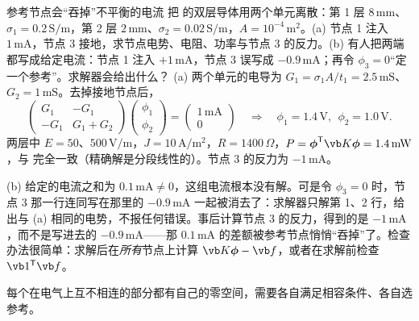 \begin{example}[label=ex:femscalar-twolayer]{参考节点会“吞掉”不平衡的电流}
把 的双层导体用两个单元离散：第 1 层 $8\,\mathrm{mm}$、$\sigma_1=0.2\,\mathrm{S/m}$，第 2 层 $2\,\mathrm{mm}$、$\sigma_2=0.02\,\mathrm{S/m}$，$A=10^{-4}\,\mathrm{m^2}$。(a) 节点 1 注入 $1\,\mathrm{mA}$，节点 3 接地，求节点电势、电阻、功率与节点 3 的反力。(b) 有人把两端都写成给定电流：节点 1 注入 $+1\,\mathrm{mA}$，节点 3 误写成 $-0.9\,\mathrm{mA}$；再令 $\phi_3=0$“定一个参考”。求解器会给出什么？
\solution
(a) 两个单元的电导为 $G_1=\sigma_1A/t_1=2.5\,\mathrm{mS}$、$G_2=1\,\mathrm{mS}$。去掉接地节点后，
\begin{equation*}
\begin{pmatrix}G_1&-G_1\\-G_1&G_1+G_2\end{pmatrix}\begin{pmatrix}\phi_1\\\phi_2\end{pmatrix}=\begin{pmatrix}1\,\mathrm{mA}\\0\end{pmatrix}
\quad\Longrightarrow\quad \phi_1=1.4\,\mathrm V,\ \ \phi_2=1.0\,\mathrm V .
\end{equation*}
两层中 $E=50$、$500\,\mathrm{V/m}$，$J=10\,\mathrm{A/m^2}$，$R=1400\,\Omega$，$P=\boldsymbol\phi^{\mathsf T}\vb K\boldsymbol\phi=1.4\,\mathrm{mW}$，与 完全一致（精确解是分段线性的）。节点 3 的反力为 $-1\,\mathrm{mA}$。

(b) 给定的电流之和为 $0.1\,\mathrm{mA}\neq0$，这组电流根本没有解。可是令 $\phi_3=0$ 时，节点 3 那一行连同写在那里的 $-0.9\,\mathrm{mA}$ 一起被消去了：求解器只解第 1、2 行，给出与 (a) 相同的电势，不报任何错误。事后计算节点 3 的反力，得到的是 $-1\,\mathrm{mA}$，而不是写进去的 $-0.9\,\mathrm{mA}$——那 $0.1\,\mathrm{mA}$ 的差额被参考节点悄悄“吞掉”了。检查办法很简单：求解后在\emph{所有}节点上计算 $\vb K\boldsymbol\phi-\vb f$，或者在求解前检查 $\vb 1^{\mathsf T}\vb f$。
\end{example}

每个在电气上互不相连的部分都有自己的零空间，需要各自满足相容条件、各自选参考。

